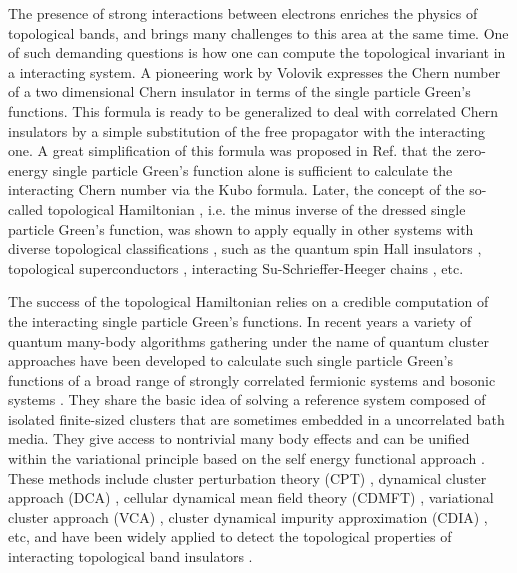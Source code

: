 \documentclass[12pt]{iopart}
\begin{document}
\par The presence of strong interactions between electrons enriches the physics of topological bands, and brings many challenges to this area at the same time. One of such demanding questions is how one can compute the topological invariant in a interacting system. A pioneering work by Volovik \cite{V2003} expresses the Chern number \cite{TKNN_PRL1982} of a two dimensional Chern insulator in terms of the single particle Green's functions. This formula is ready to be generalized to deal with correlated Chern insulators by a simple substitution of the free propagator with the interacting one. A great simplification of this formula was proposed in Ref. \cite{WZ_PRX2012} that the zero-energy single particle Green's function alone is sufficient to calculate the interacting Chern number via the Kubo formula. Later, the concept of the so-called topological Hamiltonian \cite{WY_JPCM2013}, i.e. the minus inverse of the dressed single particle Green's function, was shown to apply equally in other systems with diverse topological classifications \cite{WA_PRB2013,LEGW_PRB2013,GMCBB_NJP2015,LS_PRB2018,SK_PRB2018}, such as the quantum spin Hall insulators \cite{LEGW_PRB2013,GMCBB_NJP2015}, topological superconductors \cite{LS_PRB2018}, interacting Su-Schrieffer-Heeger chains \cite{SK_PRB2018}, etc.

\par The success of the topological Hamiltonian relies on a credible computation of the interacting single particle Green's functions. In recent years a variety of quantum many-body algorithms gathering under the name of quantum cluster approaches \cite{MJPH_RMP2005,S_arXiv2008} have been developed to calculate such single particle Green's functions of a broad range of strongly correlated fermionic systems \cite{SPP_PRL2000,HMJK_PRB2000,KSPB_PRL2001,PAD_PRL2003,BKSTP_EPL2009,KYXL_PRB2011,YXL_PRL2011,YL_PRB2012,LYXL_PRB2014} and bosonic systems \cite{KD_JPCM2006,KAL_PRB2011,YWDYL_PRB2018}. They share the basic idea of solving a reference system composed of isolated finite-sized clusters that are sometimes embedded in a uncorrelated bath media. They give access to nontrivial many body effects and can be unified within the variational principle based on the self energy functional approach \cite{P_EPJB2003}. These methods include cluster perturbation theory (CPT) \cite{SPP_PRL2000}, dynamical cluster approach (DCA) \cite{HMJK_PRB2000}, cellular dynamical mean field theory (CDMFT) \cite{KSPB_PRL2001}, variational cluster approach (VCA) \cite{PAD_PRL2003}, cluster dynamical impurity approximation (CDIA) \cite{BKSTP_EPL2009}, etc, and have been widely applied to detect the topological properties of interacting topological band insulators \cite{YXL_PRL2011,GMCBB_NJP2015,WFSM_PRB2016,LS_PRB2018}.
\end{document}
